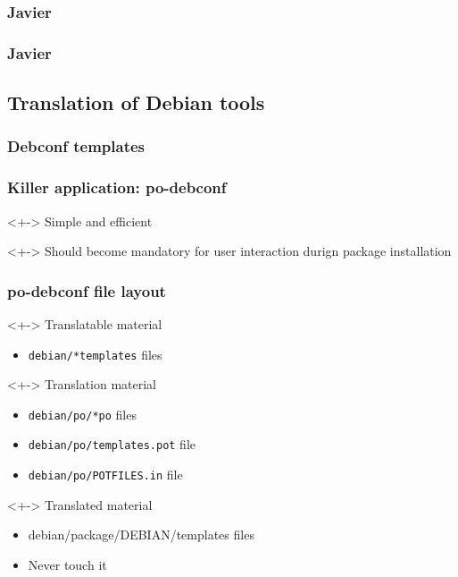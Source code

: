 \documentclass{beamer}
\begin{document}
\begin{frame}
  \frametitle{Javier}
\end{frame}

\begin{frame}
  \frametitle{Javier}
\end{frame}

\subsection{Translation of Debian tools}

\subsubsection{Debconf templates}

\begin{frame}
  \frametitle{Killer application: po-debconf}
	\begin{block}<+->
		{Simple and efficient}
	\end{block}
	\begin{block}<+->
		{Should become mandatory for user interaction durign package installation}
	\end{block}
\end{frame}

\begin{frame}
  \frametitle{po-debconf file layout}
	\begin{block}<+->
		{Translatable material}
		\begin{itemize}
		\item
			\texttt{debian/*templates} files
		\end{itemize}
	\end{block}
	\begin{block}<+->
		{Translation material}
		\begin{itemize}
		\item
			\texttt{debian/po/*po} files
		\item
			\texttt{debian/po/templates.pot} file
		\item
			\texttt{debian/po/POTFILES.in} file
		\end{itemize}
	\end{block}
	\begin{block}<+->
		{Translated material}
		\begin{itemize}
		\item
			debian/package/DEBIAN/templates files
		\item
			Never touch it
		\end{itemize}
	\end{block}
\end{frame}
\end{document}
